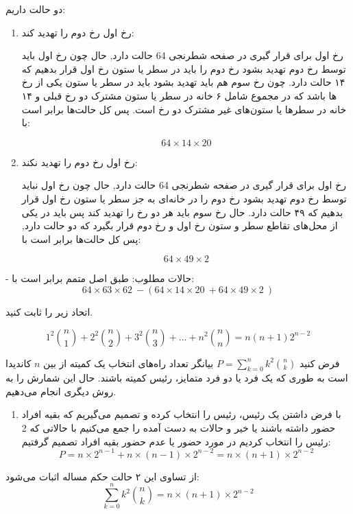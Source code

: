 \documentclass[11pt,largemargins]{h2wp}
\begin{document}
      دو حالت داریم:
      \begin{enumerate}
\item
رخ اول رخ دوم را تهدید کند:

         رخ اول برای قرار گیری در صفحه شطرنجی 64 حالت دارد, حال چون رخ اول باید توسط رخ دوم تهدید بشود رخ دوم را باید در سطر یا ستون رخ اول قرار بدهیم که ۱۴ حالت دارد. چون رخ سوم هم باید تهدید بشود باید در سطر یا ستون یکی از رخ ها باشد که در مجموع شامل ۶ خانه در سطر یا ستون مشترک دو رخ قبلی و ۱۴ خانه در سطرها یا ستون‌های غیر مشترک دو رخ است. پس کل حالت‌ها برابر است با:
         
         \[64\times14\times20\]
\item
رخ اول رخ دوم را تهدید نکند:

         رخ اول برای قرار گیری در صفحه شطرنجی 64 حالت دارد, حال چون رخ اول نباید توسط رخ دوم تهدید بشود رخ دوم را در خانه‌ای به جز سطر یا ستون رخ اول قرار بدهیم که ۴۹ حالت دارد. حال رخ سوم باید هر دو رخ را تهدید کند پس باید در یکی از محل‌های تقاطع سطر و ستون رخ اول و رخ دوم قرار بگیرد که دو حالت دارد, پس کل حالت‌ها برابر است با:
         
         \[64\times49\times2\]
         
      \end{enumerate}
-         حالات مطلوب: طبق اصل متمم برابر است با:
         \[64\times63\times62\ - (64\times14\times20\ + 64\times49\times2\ )\]
  
       
\question


  اتحاد زیر را ثابت کنید.
  
     $$1^2 {n \choose 1} + 2^2 {n \choose 2} + 3^2 {n \choose 3} + ... + n^2 {n \choose n} = n(n+1)2^{n-2}$$
     
\solution
   فرض کنید $ P = \displaystyle\sum_{k=0}^{n} {{k^2}\binom{n}{k}}$ بیانگر تعداد راه‌های انتخاب یک کمیته از بین $n$ کاندیدا است به طوری که یک فرد یا دو فرد متمایز، رئیس کمیته باشند. حال این شمارش را به روش دیگری انجام می‌دهیم.
    \begin{enumerate}
        \item 
        با فرض داشتن یک رئیس، رئیس را انتخاب کرده و تصمیم می‌گیریم که بقیه افراد حضور داشته باشند یا خیر و حالات به دست آمده را جمع می‌کنیم با حالاتی که 2 رئیس را انتخاب کردیم در مورد حضور یا عدم حضور بقیه افراد تصمیم گرفتیم:
        \[P = n\times{2^{n-1}} + n\times(n-1)\times{2^{n-2}} = n\times(n+1)\times{2^{n-2}}\]
    \end{enumerate}
    از تساوی این ۲ حالت حکم مساله اثبات می‌شود:
    \[\displaystyle\sum_{k=0}^{n} {{k^2}\binom{n}{k}} = n\times(n+1)\times{2^{n-2}}\]
    
\end{document}
